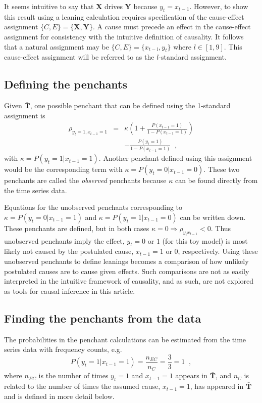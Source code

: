 \documentclass[a4paper,11pt,twocolumn]{article}
\begin{document}
It seems intuitive to say that $\mathbf{X}$ drives $\mathbf{Y}$ because $y_t=x_{t-1}$.  However, to show this result using a leaning calculation requires specification of the cause-effect assignment $\{C,E\}=\{\mathbf{X},\mathbf{Y}\}$.  A cause must precede an effect in the cause-effect assignment for consistency with the intuitive definition of causality.  It follows that a natural assignment may be $\{C,E\}=\{x_{t-l},y_t\}$ where $l\in[1,9]$.  This cause-effect assignment will be referred to as the $l$-standard assignment.

\subsection{Defining the penchants}
Given $\bar{\mathbf{T}}$, one possible penchant that can be defined using the 1-standard assignment is
\begin{eqnarray*}
\rho_{y_{t}=1,x_{t-1}=1} &=& \kappa \left(1+\frac{P\left(x_{t-1} = 1\right)}{1-P\left(x_{t-1} = 1\right)}\right)\\
& & -\frac{P\left(y_{t} = 1\right)}{1-P\left(x_{t-1} = 1\right)}\;\;,
\end{eqnarray*}
with $\kappa = P\left( y_t = 1 | x_{t-1} = 1\right)$.  Another penchant defined using this assignment would be the corresponding term with $\kappa = P\left( y_t = 0 | x_{t-1} = 0\right)$.  These two penchants are called the {\em observed} penchants because $\kappa$ can be found directly from the time series data.  

Equations for the unobserved penchants corresponding to $\kappa = P\left( y_t = 0 | x_{t-1} = 1\right)$ and $\kappa = P\left( y_t = 1 | x_{t-1} = 0\right)$ can be written down.  These penchants are defined, but in both cases $\kappa=0\Rightarrow \rho_{y_{t}x_{t-1}} < 0$.  Thus unobserved penchants imply the effect, $y_t = 0$ or $1$ (for this toy model) is most likely not caused by the postulated cause, $x_{t-1} = 1$ or $0$, respectively.  Using these unobserved penchants to define leanings becomes a comparison of how unlikely postulated causes are to cause given effects.  Such comparisons are not as easily interpreted in the intuitive framework of causality, and as such, are not explored as tools for causal inference in this article. 

\subsection{Finding the penchants from the data}
The probabilities in the penchant calculations can be estimated from the time series data with frequency counts, e.g.\
$$
P\left( y_t = 1 | x_{t-1} = 1\right) = \frac{n_{EC}}{n_C} = \frac{3}{3} = 1\;\;,
$$
where $n_{EC}$ is the number of times $y_t=1$ and $x_{t-1}=1$ appears in $\bar{\mathbf{T}}$, and $n_{C}$ is related to the number of times the assumed cause, $x_{t-1}=1$, has appeared in $\bar{\mathbf{T}}$ and is defined in more detail below.      
\end{document}
